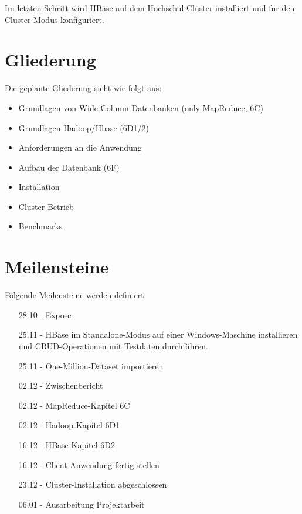 Im letzten Schritt wird HBase auf dem Hochschul-Cluster installiert und für den Cluster-Modus konfiguriert.

\section{Gliederung}
Die geplante Gliederung sieht wie folgt aus:
\begin{itemize}
	\item Grundlagen von Wide-Column-Datenbanken (only MapReduce, 6C)
	\item Grundlagen Hadoop/Hbase (6D1/2)
	\item Anforderungen an die Anwendung
	\item Aufbau der Datenbank (6F)
	\item Installation
	\item Cluster-Betrieb
	\item Benchmarks
\end{itemize}

\section{Meilensteine}
Folgende Meilensteine werden definiert:
\begin{itemize}
\item[28.10] - Expose
\item[25.11] - HBase im Standalone-Modus auf einer Windows-Maschine installieren und CRUD-Operationen mit Testdaten durchführen.
\item[25.11] - One-Million-Dataset importieren
\item[02.12] - Zwischenbericht
\item[02.12] - MapReduce-Kapitel 6C
\item[02.12] - Hadoop-Kapitel 6D1  
\item[16.12] - HBase-Kapitel 6D2 
\item[16.12] - Client-Anwendung fertig stellen
\item[23.12] - Cluster-Installation abgeschlossen
\item[06.01] - Ausarbeitung Projektarbeit
\end{itemize}

